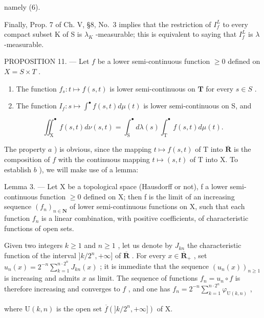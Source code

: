 namely (6).

Finally, Prop. 7 of Ch. V, §8, No.~3 implies that the restriction of \(I_{f}^{L}\) to every compact subset K of S is \(\lambda_{K}\) -measurable; this is equivalent to saying that \(I_{f}^{L}\) is \(\lambda\) -measurable.

PROPOSITION 11. --- Let \(f\) be a lower semi-continuous function \(\geqslant 0\) defined on \(X = S \times T\) .

\begin{enumerate}
\def\labelenumi{\alph{enumi})}
\item
  The function \(f_{s}: t \mapsto f(s, t)\) is lower semi-continuous on \(\mathbf{T}\) for every \(s \in S\) .
\item
  The function \(I_{f}: s \mapsto \int^{\bullet} f(s, t) d\mu(t)\) is lower semi-continuous on S, and
\end{enumerate}

\[
\iint_ {\mathrm{X}} ^ {\bullet} f (s, t) d \nu (s, t) = \int_ {\mathrm{S}} ^ {\bullet} d \lambda (s) \int_ {\mathrm{T}} ^ {\bullet} f (s, t) d \mu (t).\tag{9}
\]

The property \(a\) ) is obvious, since the mapping \(t \mapsto f(s,t)\) of T into \(\overline{\mathbf{R}}\) is the composition of \(f\) with the continuous mapping \(t \mapsto (s,t)\) of T into X. To establish \(b\) ), we will make use of a lemma:

Lemma 3. --- Let X be a topological space (Hausdorff or not), f a lower semi-continuous function \(\geqslant 0\) defined on X; then f is the limit of an increasing sequence \((f_{n})_{n\in\mathbf{N}}\) of lower semi-continuous functions on X, such that each function \(f_{n}\) is a linear combination, with positive coefficients, of characteristic functions of open sets.

Given two integers \(k \geqslant 1\) and \(n \geqslant 1\) , let us denote by \(J_{kn}\) the characteristic function of the interval \(]k/2^n, +\infty]\) of \(\overline{\mathbf{R}}\) . For every \(x \in \overline{\mathbf{R}}_+\) , set \(u_n(x) = 2^{-n} \sum_{k=1}^{n \cdot 2^n} J_{kn}(x)\) ; it is immediate that the sequence \((u_n(x))_{n \geqslant 1}\) is increasing and admits \(x\) as limit. The sequence of functions \(f_n = u_n \circ f\) is therefore increasing and converges to \(f\) , and one has \(f_{n} = 2^{-n}\sum_{k = 1}^{n\cdot 2^{n}}\varphi_{\mathrm{U}(k,n)}\) ,

where \(\mathrm{U}(k,n)\) is the open set \(\overline{f} (]k / 2^n, + \infty ])\) of X.

